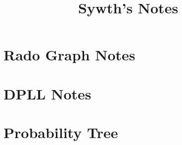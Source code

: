\documentclass[12pt]{article}
\title{\textbf{Sywth's Notes}}
\author{}
\date{}
\begin{document}
\maketitle
\tableofcontents
\newpage

\section{Rado Graph Notes}


\section{DPLL Notes}


\section{Probability Tree}

\end{document}
